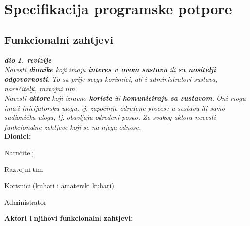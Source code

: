 \chapter{Specifikacija programske potpore}
		
	\section{Funkcionalni zahtjevi}
			
			\textbf{\textit{dio 1. revizije}}\\
			
			\textit{Navesti \textbf{dionike} koji imaju \textbf{interes u ovom sustavu} ili  \textbf{su nositelji odgovornosti}. To su prije svega korisnici, ali i administratori sustava, naručitelji, razvojni tim.}\\
				
			\textit{Navesti \textbf{aktore} koji izravno \textbf{koriste} ili \textbf{komuniciraju sa sustavom}. Oni mogu imati inicijatorsku ulogu, tj. započinju određene procese u sustavu ili samo sudioničku ulogu, tj. obavljaju određeni posao. Za svakog aktora navesti funkcionalne zahtjeve koji se na njega odnose.}\\
			
			
			\noindent \textbf{Dionici:}
			
			\begin{packed_enum}
				
				\item Naručitelj 
				\item Razvojni tim
				\item Korisnici (kuhari i amaterski kuhari)
				\item Administrator
				
			\end{packed_enum}
			
			\noindent \textbf{Aktori i njihovi funkcionalni zahtjevi:}
			
